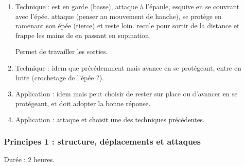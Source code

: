 \begin{enumerate}
	\item Technique : \D est en garde (basse), \A attaque à l'épaule, \D esquive en se couvrant avec l'épée.
	\D attaque \A (penser au mouvement de hanche), \A se protège en ramenant son épée (tierce) et reste loin.
	\D recule pour sortir de la distance et frappe les mains de \A en passant en supination.
	
	Permet de travailler les sorties.
	
	\item Technique : idem que précédemment mais \A avance en se protégeant, \D entre en lutte (crochetage de l'épée ?).
	
	\item Application : idem mais \A peut choisir de rester sur place ou d'avancer en se protégeant, et \D doit adopter la bonne réponse.
	
	\item Application : \A attaque et \D choisit une des techniques précédentes.
\end{enumerate}



\subsubsection{Principes 1 : structure, déplacements et attaques}


Durée : 2 heures.


